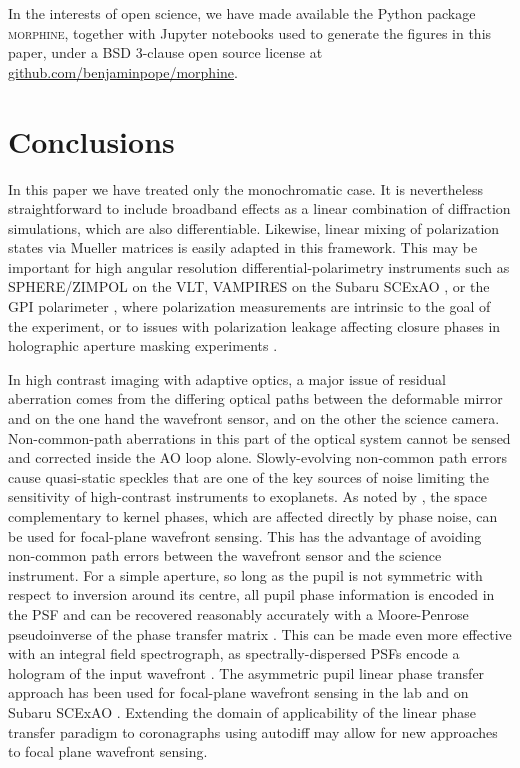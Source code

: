 \documentclass[modern]{aastex63}
\begin{document}
In the interests of open science, we have made available the Python package \textsc{morphine}, together with Jupyter notebooks used to generate the figures in this paper, under a BSD 3-clause open source license at \href{https://github.com/benjaminpope/morphine}{github.com/benjaminpope/morphine}.

\section{Conclusions}
\label{sec:conclusions}

In this paper we have treated only the monochromatic case. It is nevertheless straightforward to include broadband effects as a linear combination of diffraction simulations, which are also differentiable. Likewise, linear mixing of polarization states via Mueller matrices is easily adapted in this framework. This may be important for high angular resolution differential-polarimetry instruments such as SPHERE/ZIMPOL \citep{zimpol} on the VLT, VAMPIRES on the Subaru SCExAO \citep{vampires}, or the GPI polarimeter \citep{gpipol}, where polarization measurements are intrinsic to the goal of the experiment, or to issues with polarization leakage affecting closure phases in holographic aperture masking experiments \citep[e.g.][]{doelman18}.

In high contrast imaging with adaptive optics, a major issue of residual aberration comes from the differing optical paths between the deformable mirror and on the one hand the wavefront sensor, and on the other the science camera. Non-common-path aberrations in this part of the optical system cannot be sensed and corrected inside the AO loop alone. Slowly-evolving non-common path errors cause quasi-static speckles that are one of the key sources of noise limiting the sensitivity of high-contrast instruments to exoplanets. As noted by \citet{martinache13}, the space complementary to kernel phases, which are affected directly by phase noise, can be used for focal-plane wavefront sensing. This has the advantage of avoiding non-common path errors between the wavefront sensor and the science instrument. For a simple aperture, so long as the pupil is not symmetric with respect to inversion around its centre, all pupil phase information is encoded in the PSF and can be recovered reasonably accurately with a Moore-Penrose pseudoinverse of the phase transfer matrix \citep{moore1920,bjerhammar1951,penrose_1955}. This can be made even more effective with an integral field spectrograph, as spectrally-dispersed PSFs encode a hologram of the input wavefront \citep{martinache16}. The asymmetric pupil linear phase transfer approach has been used for focal-plane wavefront sensing in the lab \citep[e.g.][]{pope14,swift} and on Subaru SCExAO \citep{martinache16b}. Extending the domain of applicability of the linear phase transfer paradigm to coronagraphs using autodiff may allow for new approaches to focal plane wavefront sensing. 
\end{document}

